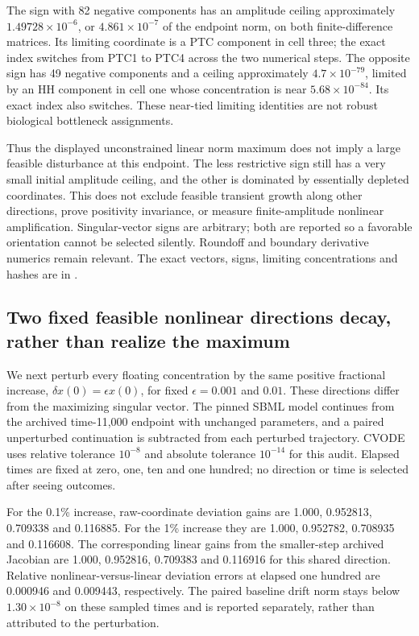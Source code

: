 The sign with 82 negative components has an amplitude ceiling approximately $1.49728\times10^{-6}$, or $4.861\times10^{-7}$ of the endpoint norm, on both finite-difference matrices. Its limiting coordinate is a PTC component in cell three; the exact index switches from PTC1 to PTC4 across the two numerical steps. The opposite sign has 49 negative components and a ceiling approximately $4.7\times10^{-79}$, limited by an HH component in cell one whose concentration is near $5.68\times10^{-84}$. Its exact index also switches. These near-tied limiting identities are not robust biological bottleneck assignments.

Thus the displayed unconstrained linear norm maximum does not imply a large feasible disturbance at this endpoint. The less restrictive sign still has a very small initial amplitude ceiling, and the other is dominated by essentially depleted coordinates. This does not exclude feasible transient growth along other directions, prove positivity invariance, or measure finite-amplitude nonlinear amplification. Singular-vector signs are arbitrary; both are reported so a favorable orientation cannot be selected silently. Roundoff and boundary derivative numerics remain relevant. The exact vectors, signs, limiting concentrations and hashes are in .

\subsection{Two fixed feasible nonlinear directions decay, rather than realize the maximum}
We next perturb every floating concentration by the same positive fractional increase, $\delta x(0)=\epsilon x(0)$, for fixed $\epsilon=0.001$ and $0.01$. These directions differ from the maximizing singular vector. The pinned SBML model continues from the archived time-11,000 endpoint with unchanged parameters, and a paired unperturbed continuation is subtracted from each perturbed trajectory. CVODE uses relative tolerance $10^{-8}$ and absolute tolerance $10^{-14}$ for this audit. Elapsed times are fixed at zero, one, ten and one hundred; no direction or time is selected after seeing outcomes.

For the 0.1\% increase, raw-coordinate deviation gains are 1.000, 0.952813, 0.709338 and 0.116885. For the 1\% increase they are 1.000, 0.952782, 0.708935 and 0.116608. The corresponding linear gains from the smaller-step archived Jacobian are 1.000, 0.952816, 0.709383 and 0.116916 for this shared direction. Relative nonlinear-versus-linear deviation errors at elapsed one hundred are 0.000946 and 0.009443, respectively. The paired baseline drift norm stays below $1.30\times10^{-8}$ on these sampled times and is reported separately, rather than attributed to the perturbation.

